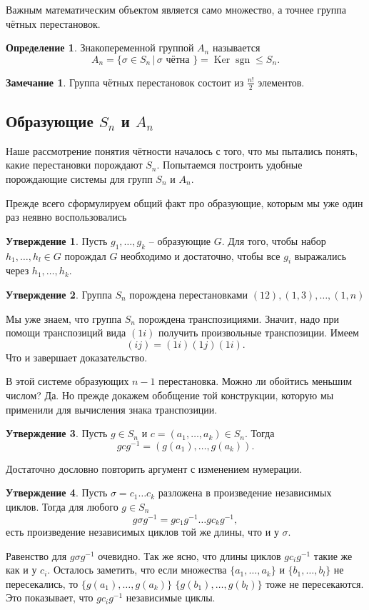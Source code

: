 \documentclass[10pt,a4paper,oneside]{book}
\theoremstyle{definition}
\newtheorem*{rem}{\color{green!50!blue}Замечание}
\newtheorem*{defn}{\color{yellow!30!red} Определение}
\newtheorem{utvr}{\color{blue!50!black}Утверждение}
\renewcommand{\leq}{\leqslant}
\DeclareMathOperator{\Ker}{Ker}
\newcommand{\sgn}{\operatorname{sgn}}
\def\dfn{\begin{defn}}
\def\edfn{\end{defn}}
\def\rm{\begin{rem}}
\def\erm{\end{rem}}
\def\utv{\begin{utvr}}
\def\eutv{\end{utvr}}
\begin{document}
Важным математическим объектом является само множество, а точнее группа чётных перестановок.

\dfn Знакопеременной группой $A_n$ называется
$$A_n=\{\sigma \in S_n\,|\, \sigma \text{ чётна } \} = \Ker \sgn \leq S_n.$$
\edfn

\rm Группа чётных перестановок состоит из $\frac{n!}{2}$ элементов.
\erm

\subsection{Образующие $S_n$ и $A_n$}

Наше рассмотрение понятия чётности началось с того, что мы пытались понять, какие перестановки порождают $S_n$. Попытаемся построить удобные порождающие системы для групп $S_n$ и $A_n$.

Прежде всего сформулируем общий факт про образующие, которым мы уже один раз неявно воспользовались

\utv Пусть $g_1,\dots,g_k $ -- образующие $G$. Для того, чтобы набор $h_1,\dots,h_l\in G$ порождал  $G$ необходимо и достаточно, чтобы все $g_i$ выражались через $h_1,\dots,h_k$. 
\eutv

\utv Группа $S_n$ порождена перестановками $(12), (1,3),\dots, (1,n)$
\eutv
\proof Мы уже знаем, что группа $S_n$ порождена транспозициями. Значит, надо при помощи транспозиций вида $(1i)$ получить произвольные транспозиции.  Имеем
$$(ij)=(1i)(1j)(1i).$$
Что и завершает доказательство.
\endproof

В этой системе образующих $n-1$ перестановка. Можно ли обойтись меньшим числом? Да. Но прежде докажем обобщение той конструкции, которую мы применили для вычисления знака транспозиции.

\utv Пусть $g\in S_n$ и $c=(a_1,\dots,a_k)\in S_n$. Тогда 
$$gcg^{-1}=(g(a_1),\dots,g(a_k)).$$
\eutv
\proof Достаточно дословно повторить аргумент с изменением нумерации.
\endproof

\utv Пусть $\sigma=c_1\dots c_k$ разложена в произведение независимых циклов. Тогда для любого $g\in S_n$
$$g\sigma g^{-1}= gc_1 g^{-1}\dots gc_kg^{-1},$$
есть произведение независимых циклов той же длины, что и у $\sigma$.
\eutv
\proof Равенство для $g\sigma g^{-1}$ очевидно. Так же ясно, что длины циклов $gc_i g^{-1}$ такие же как и у $c_i$. Осталось заметить, что если множества $\{a_1,\dots,a_k\}$ и $\{b_1,\dots,b_l\}$ не пересекались, то $\{g(a_1),\dots,g(a_k)\}$ $\{g(b_1),\dots,g(b_l)\}$ тоже не пересекаются. Это показывает, что $gc_i g^{-1}$ независимые циклы.
\endproof
\end{document}
